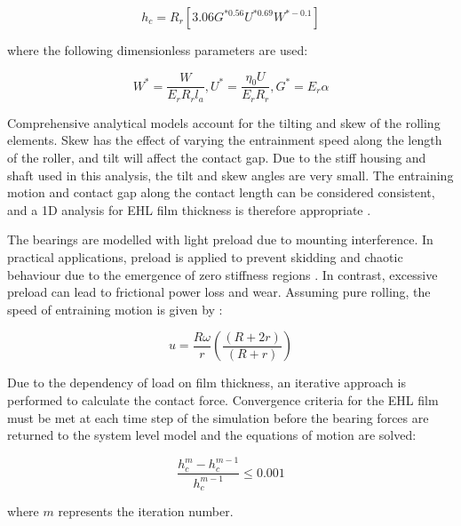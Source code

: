 \begin{equation}\label{DowsonToyodaCentralFilm}
	h_c=R_r\left[3.06 G^{* 0.56} U^{* 0.69} W^{*-0.1}\right]
\end{equation}

where the following dimensionless parameters are used:

\begin{equation}\label{DowsonToyodaDimensionless}
	W^*=\frac{W}{E_r R_r l_a}, U^*=\frac{\eta_0 U}{E_r R_r}, G^*=E_r \alpha
\end{equation}

Comprehensive analytical models \cite{Nelias2008} \cite{Majdoub2020} account for the tilting and skew of the rolling elements. Skew has the effect of varying the entrainment speed along the length of the roller, and tilt will affect the contact gap. Due to the stiff housing and shaft used in this analysis, the tilt and skew angles are very small. The entraining motion and contact gap along the contact length can be considered consistent, and a 1D analysis for EHL film thickness is therefore appropriate \cite{Gupta1979}.

The bearings are modelled with light preload due to mounting interference. In practical applications, preload is applied to prevent skidding and chaotic behaviour due to the emergence of zero stiffness regions \cite{Mevel1993}. In contrast, excessive preload can lead to frictional power loss and wear. Assuming pure rolling, the speed of entraining motion is given by \cite{Spikes2015} \cite{Shi2015}: 
	
\begin{equation}\label{SpikesEntrainmentSpeed}
	u=\frac{R \omega}{r}\left(\frac{(R+2 r)}{(R+r)}\right)
\end{equation}

Due to the dependency of load on film thickness, an iterative approach is performed to calculate the contact force. Convergence criteria for the EHL film must be met at each time step of the simulation before the bearing forces are returned to the system level model and the equations of motion are solved:

\begin{equation}\label{FilmConvergence}
	\frac{h_c^m-h_c^{m-1}}{h_c^{m-1}} \leq 0.001
\end{equation}

where $m$ represents the iteration number.

